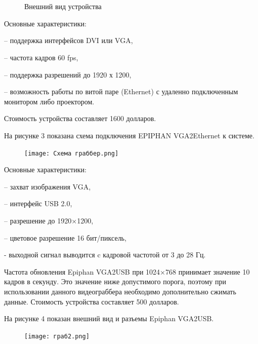 \begin{figure}[H]
\begin{minipage}[h]{0.47\linewidth}
 \\
\end{minipage}
\vfill
\begin{minipage}[h]{0.47\linewidth}
 \\
\end{minipage}
\caption{Внешний вид устройства}
\label{ris:experimentalcorrelationsignals}
\end{figure}

Основные характеристики:

– поддержка интерфейсов DVI или VGA,

– частота кадров 60 fps,

– поддержка разрешений до 1920 х 1200,

– возможность работы по витой паре (Ethernet) с удаленно подключенным монитором либо проектором.

Стоимость устройства составляет 1600 долларов. 

На рисунке 3 показана схема подключения EPIPHAN VGA2Ethernet к системе.

\begin{figure}[!h]
\begin{center}
\texttt{[image: Схема граббер.png]}
\caption{\centering {}}
\label{част}
\end{center}
\end{figure}

Основные характеристики:

– захват изображения VGA,

– интерфейс USB 2.0,

– разрешение до 1920×1200,

– цветовое разрешение 16 бит/пиксель,

- выходной сигнал выводится c кадровой частотой от 3 до 28 Гц.

Частота обновления Epiphan VGA2USB при 1024×768 принимает значение 10 кадров в секунду. Это значение ниже допустимого порога, поэтому при использовании данного видеограббера необходимо дополнительно сжимать данные. Стоимость устройства составляет 500 долларов. 

На рисунке 4 показан внешний вид и разъемы Epiphan VGA2USB.

\begin{figure}[!h]
\begin{center}
\texttt{[image: граб2.png]}
\caption{\centering {}}
\label{част}
\end{center}
\end{figure}

